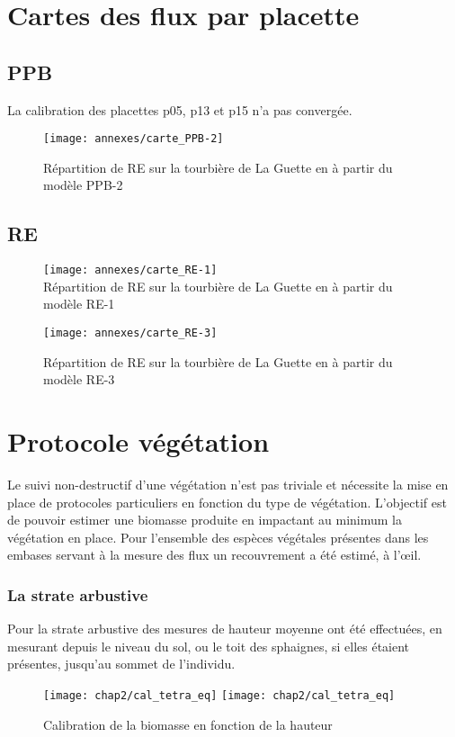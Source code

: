 \clearpage
\section{Cartes des flux par placette}
\label{sec:carte_flux}

\subsection{PPB}
\label{subsec:carte_ppb}
La calibration des placettes p05, p13 et p15 n'a pas convergée.

\begin{figure}[!hbt]
\centering
\texttt{[image: annexes/carte\_PPB-2]}
\caption{Répartition de RE sur la tourbière de La Guette en \si{\gcma} à partir du modèle PPB-2}
\label{fig:rep_PPB-2}
\end{figure}

\clearpage
\subsection{RE}
\label{subsec:carte_re}

\begin{figure}[!hbt]
\centering
\texttt{[image: annexes/carte\_RE-1]}\\
\caption{Répartition de RE sur la tourbière de La Guette en \si{\gcma} à partir du modèle RE-1}
\label{fig:rep_RE-1}
\texttt{[image: annexes/carte\_RE-3]}
\caption{Répartition de RE sur la tourbière de La Guette en \si{\gcma} à partir du modèle RE-3}
\label{fig:rep_RE-3}
\end{figure}







\section{Protocole végétation}
\label{sec:protocole_veg}


Le suivi non-destructif d'une végétation n'est pas triviale et nécessite la mise en place de protocoles particuliers en fonction du type de végétation.
L'objectif est de pouvoir estimer une biomasse produite en impactant au minimum la végétation en place.
Pour l'ensemble des espèces végétales présentes dans les embases servant à la mesure des flux un recouvrement a été estimé, à l’œil.


\subsubsection{La strate arbustive}
Pour la strate arbustive des mesures de hauteur moyenne ont été effectuées, en mesurant depuis le niveau du sol, ou le toit des sphaignes, si elles étaient présentes, jusqu'au sommet de l'individu.
\begin{figure}
\texttt{[image: chap2/cal\_tetra\_eq]}
\texttt{[image: chap2/cal\_tetra\_eq]}
\caption{Calibration de la biomasse en fonction de la hauteur}
\label{fig:cal_arbu}
\end{figure}

